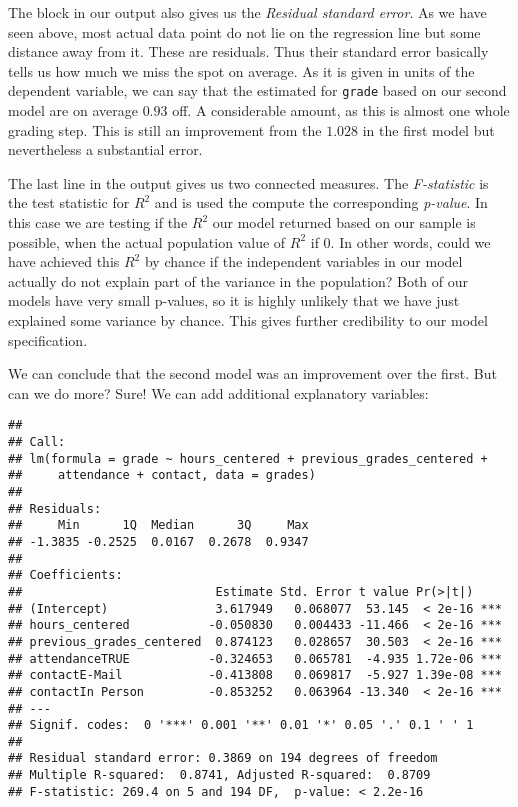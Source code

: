 \documentclass[
]{book}
\begin{document}
The block in our output also gives us the \emph{Residual standard error}. As we have
seen above, most actual data point do not lie on the regression line but some
distance away from it. These are residuals. Thus their standard error basically
tells us how much we miss the spot on average. As it is given in units of the
dependent variable, we can say that the estimated for \texttt{grade} based on our
second model are on average \(0.93\) off. A considerable amount, as this is almost
one whole grading step. This is still an improvement from the \(1.028\) in the
first model but nevertheless a substantial error.

The last line in the output gives us two connected measures. The \emph{F-statistic}
is the test statistic for \(R^2\) and is used the compute the corresponding
\emph{p-value}.
In this case we are testing if the \(R^2\) our model returned based on our sample
is possible, when the actual population value of \(R^2\) if \(0\). In other words,
could we have achieved this \(R^2\) by chance if the independent variables in our
model actually do not explain part of the variance in the population?
Both of our models have very small p-values, so it is highly unlikely that we
have just explained some variance by chance. This gives further credibility to
our model specification.

We can conclude that the second model was an improvement over the first. But can
we do more? Sure! We can add additional explanatory variables:

\begin{verbatim}
## 
## Call:
## lm(formula = grade ~ hours_centered + previous_grades_centered + 
##     attendance + contact, data = grades)
## 
## Residuals:
##     Min      1Q  Median      3Q     Max 
## -1.3835 -0.2525  0.0167  0.2678  0.9347 
## 
## Coefficients:
##                           Estimate Std. Error t value Pr(>|t|)    
## (Intercept)               3.617949   0.068077  53.145  < 2e-16 ***
## hours_centered           -0.050830   0.004433 -11.466  < 2e-16 ***
## previous_grades_centered  0.874123   0.028657  30.503  < 2e-16 ***
## attendanceTRUE           -0.324653   0.065781  -4.935 1.72e-06 ***
## contactE-Mail            -0.413808   0.069817  -5.927 1.39e-08 ***
## contactIn Person         -0.853252   0.063964 -13.340  < 2e-16 ***
## ---
## Signif. codes:  0 '***' 0.001 '**' 0.01 '*' 0.05 '.' 0.1 ' ' 1
## 
## Residual standard error: 0.3869 on 194 degrees of freedom
## Multiple R-squared:  0.8741, Adjusted R-squared:  0.8709 
## F-statistic: 269.4 on 5 and 194 DF,  p-value: < 2.2e-16
\end{verbatim}
\end{document}
